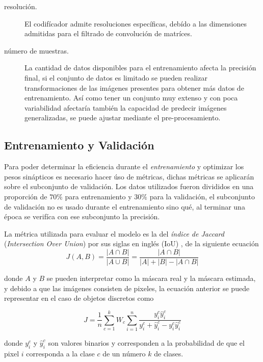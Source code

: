 \begin{description}
    \item[resolución.]{ El codifícador admite resoluciones específicas, debído a las dimensiones admitidas para el filtrado de convolución de matríces.}
    \item[número de muestras.]{La cantidad de datos disponibles para el entrenamiento afecta la precisión final, si el conjunto de datos es limitado se pueden realizar transformaciones de las imágenes presentes para obtener más datos de entrenamiento. Así como tener un conjunto muy extenso y con poca variabilidad afectaría también la capacidad de predecir imágenes generalizadas, se puede ajustar mediante el pre-procesamiento.}
    \item[] 
\end{description}

\subsection{Entrenamiento y Validación}
Para poder determinar la eficiencia durante el \emph{entrenamiento} y optimizar los pesos sinápticos es necesario hacer úso de métricas, dichas métricas se aplicarán sobre el subconjunto de validación. Los datos utilizados fueron divididos en una proporción de $70\%$ para entrenamiento y $30\%$ para la validación, el subconjunto de validación no es usado durante el entrenamiento sino qué, al terminar una época se verifíca con ese subconjunto la precisión.


La métrica utilizada para evaluar el modelo es la del \emph{índice de Jaccard} (\emph{Intersection Over Union}) por sus siglas en inglés (IoU) \citep{fpn_1}, de la siguiente ecuación
\begin{equation}
    J(A,B) = \frac{|A \cap B|}{| A \cup B |} = \frac{|A \cap B|}{|A| + |B| - |A \cap B|}
\end{equation} 

donde $A$ y $B$ se pueden interpretar como la máscara real y la máscara estimada, y debido a que las imágenes consisten de pixeles, la ecuación anterior se puede representar en el caso de objetos discretos como

\begin{equation}
    J = \frac{1}{n} \sum_{c=1}^{k} W_c \sum_{i=1}^{n}\frac{y_i^c \hat y_i^c}{y_i^c + \hat y_i^c - y_i^c \hat y_i^c}
\end{equation} 

donde $y_i^c$ y $\hat y_i^c$ son valores binarios y corresponden a la probabilidad de que el pixel $i$ corresponda a la clase $c$ de un número $k$ de clases.

